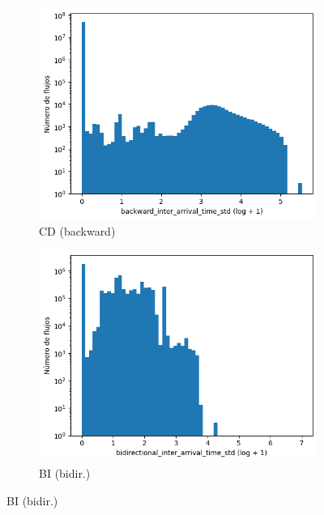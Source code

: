 \begin{figure}[H]
\begin{subfigure}[b]{0.26\textwidth}
        \includegraphics[width=\textwidth]{media/packet_pincer_cicddos/backward_inter_arrival_time_std_log_x_log_y.png}
        \caption{CD (backward)}
    \end{subfigure}
    \hfill
    \begin{subfigure}[b]{0.26\textwidth}
        \centering
        \includegraphics[width=\linewidth]{media/packet_pincer_botiot/bidirectional_inter_arrival_time_std_log_x_log_y.png}
        \caption{BI (bidir.)}

\end{subfigure}
\end{figure}
